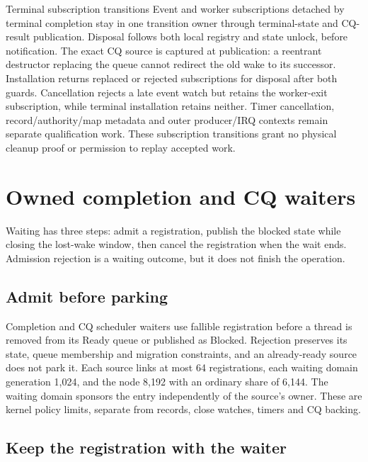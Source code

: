 \begin{implementationdetail}{Terminal subscription transitions}
Event and worker subscriptions detached by terminal completion stay in one
transition owner through terminal-state and CQ-result publication. Disposal
follows both local registry and state unlock, before notification. The exact CQ
source is captured at publication: a reentrant destructor replacing the queue
cannot redirect the old wake to its successor. Installation returns replaced or
rejected subscriptions for disposal after both guards. Cancellation rejects a
late event watch but retains the worker-exit subscription, while terminal installation
retains neither. Timer cancellation, record/authority/map metadata and outer
producer/IRQ contexts remain separate qualification work. These subscription
transitions grant no physical cleanup proof or permission to replay accepted work.
\end{implementationdetail}

\section{Owned completion and CQ waiters}

Waiting has three steps: admit a registration, publish the blocked state while
closing the lost-wake window, then cancel the registration when the wait ends.
Admission rejection is a waiting outcome, but it does not finish the operation.

\subsection{Admit before parking}

Completion and CQ scheduler waiters use fallible registration before a thread
is removed from its Ready queue or published as Blocked. Rejection preserves
its state, queue membership and migration constraints, and an already-ready source
does not park it. Each source links at most 64 registrations, each waiting domain
generation 1,024, and the node 8,192 with an ordinary share of 6,144. The waiting
domain sponsors the entry independently of the source's owner. These are kernel
policy limits, separate from records, close watches, timers and CQ backing.

\subsection{Keep the registration with the waiter}

